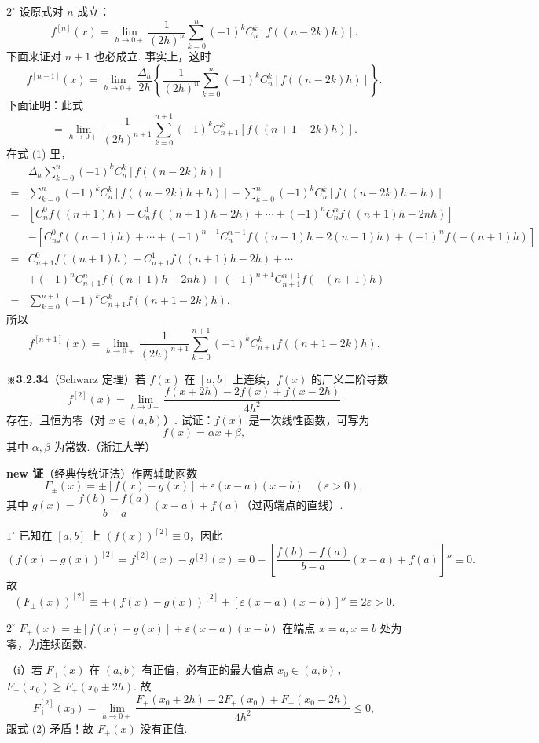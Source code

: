 \documentclass[UTF8, 12pt, fontset=fandol, oneside]{ctexart}
\begin{document}
$2^\circ$ 设原式对 $n$ 成立：
\[
  f^{[n]}(x)=\lim_{h\to0+}\frac1{(2h)^n}
  \sum_{k=0}^n(-1)^kC_n^k[f((n-2k)h)].
\tag{1}
\]
下面来证对 $n+1$ 也必成立. 事实上，这时
\[
  f^{[n+1]}(x)=
  \lim_{h\to0+}\frac{\Delta_h}{2h}
  \left\{\frac1{(2h)^n}\sum_{k=0}^n(-1)^kC_n^k[f((n-2k)h)]\right\}.
\]
下面证明：此式
\[
  =
  \lim_{h\to0+}\frac1{(2h)^{n+1}}
  \sum_{k=0}^{n+1}(-1)^kC_{n+1}^k[f((n+1-2k)h)].
\]
在式 (1) 里，
\[
\begin{aligned}
&\Delta_h\sum_{k=0}^n(-1)^kC_n^k[f((n-2k)h)]\\
={}&
\sum_{k=0}^n(-1)^kC_n^k[f((n-2k)h+h)]
-
\sum_{k=0}^n(-1)^kC_n^k[f((n-2k)h-h)]\\
={}&[C_n^0f((n+1)h)-C_n^1f((n+1)h-2h)+\cdots+(-1)^nC_n^nf((n+1)h-2nh)]\\
&-[C_n^0f((n-1)h)+\cdots+(-1)^{n-1}C_n^{n-1}f((n-1)h-2(n-1)h)+(-1)^nf(-(n+1)h)]\\
={}&
C_{n+1}^0f((n+1)h)-C_{n+1}^1f((n+1)h-2h)+\cdots\\
&+(-1)^nC_{n+1}^nf((n+1)h-2nh)+(-1)^{n+1}C_{n+1}^{n+1}f(-(n+1)h)\\
={}&\sum_{k=0}^{n+1}(-1)^kC_{n+1}^kf((n+1-2k)h).
\end{aligned}
\]
所以
\[
  f^{[n+1]}(x)=
  \lim_{h\to0+}\frac1{(2h)^{n+1}}
  \sum_{k=0}^{n+1}(-1)^kC_{n+1}^kf((n+1-2k)h).
\]

\noindent\textbf{※3.2.34}\quad （Schwarz 定理）若 $f(x)$ 在 $[a,b]$ 上连续，$f(x)$ 的广义二阶导数
\[
  f^{[2]}(x)=\lim_{h\to0+}\frac{f(x+2h)-2f(x)+f(x-2h)}{4h^2}
\]
存在，且恒为零（对 $x\in(a,b)$）. 试证：$f(x)$ 是一次线性函数，可写为
\[
  f(x)=\alpha x+\beta,
\]
其中 $\alpha,\beta$ 为常数.（浙江大学）

\noindent\textbf{new 证}\quad （经典传统证法）作两辅助函数
\begin{equation}
  F_\pm(x)=\pm[f(x)-g(x)]+\varepsilon(x-a)(x-b)\quad(\varepsilon>0),
\tag{1}
\end{equation}
其中 $g(x)=\dfrac{f(b)-f(a)}{b-a}(x-a)+f(a)$（过两端点的直线）.

$1^\circ$ 已知在 $[a,b]$ 上 $(f(x))^{[2]}\equiv0$，因此
\[
  (f(x)-g(x))^{[2]}=f^{[2]}(x)-g^{[2]}(x)=0-\left[\frac{f(b)-f(a)}{b-a}(x-a)+f(a)\right]''\equiv0.
\]
故
\[
  (F_\pm(x))^{[2]}\equiv\pm(f(x)-g(x))^{[2]}+[\varepsilon(x-a)(x-b)]''\equiv2\varepsilon>0.
\tag{2}
\]

$2^\circ$ $F_\pm(x)=\pm[f(x)-g(x)]+\varepsilon(x-a)(x-b)$ 在端点 $x=a,x=b$ 处为零，为连续函数.

（i）若 $F_+(x)$ 在 $(a,b)$ 有正值，必有正的最大值点 $x_0\in(a,b)$，$F_+(x_0)\ge F_+(x_0\pm2h)$. 故
\[
  F_+^{[2]}(x_0)
  =
  \lim_{h\to0+}
  \frac{F_+(x_0+2h)-2F_+(x_0)+F_+(x_0-2h)}{4h^2}
  \le0,
\]
跟式 (2) 矛盾！故 $F_+(x)$ 没有正值.
\end{document}
